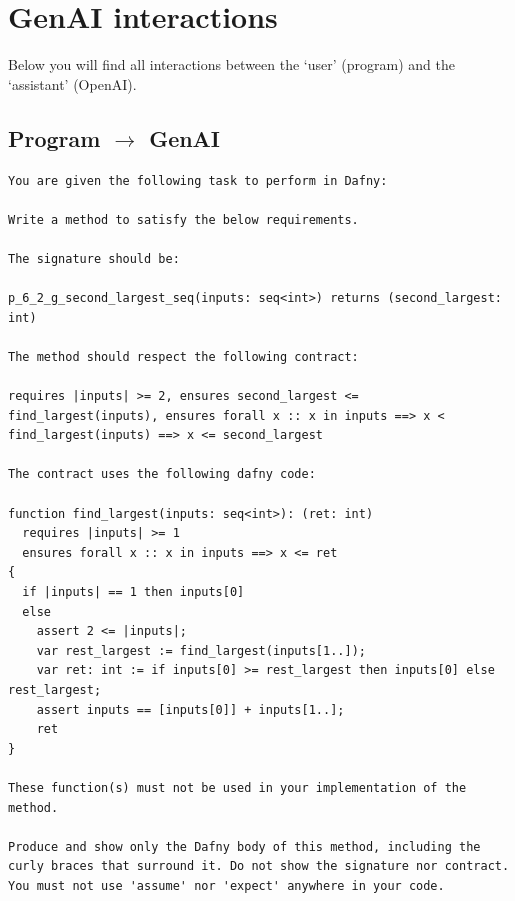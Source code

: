 \documentclass{article}
\begin{document}
\section*{GenAI interactions}
Below you will find all interactions between the `user' (program) and the `assistant' (OpenAI).
\subsection*{Program $\rightarrow$ GenAI}
\begin{lstlisting}
You are given the following task to perform in Dafny:

Write a method to satisfy the below requirements.

The signature should be:

p_6_2_g_second_largest_seq(inputs: seq<int>) returns (second_largest: int)

The method should respect the following contract:

requires |inputs| >= 2, ensures second_largest <= find_largest(inputs), ensures forall x :: x in inputs ==> x < find_largest(inputs) ==> x <= second_largest

The contract uses the following dafny code:

function find_largest(inputs: seq<int>): (ret: int)
  requires |inputs| >= 1
  ensures forall x :: x in inputs ==> x <= ret
{
  if |inputs| == 1 then inputs[0]
  else 
    assert 2 <= |inputs|;
    var rest_largest := find_largest(inputs[1..]);
    var ret: int := if inputs[0] >= rest_largest then inputs[0] else rest_largest;
    assert inputs == [inputs[0]] + inputs[1..]; 
    ret 
} 

These function(s) must not be used in your implementation of the method.

Produce and show only the Dafny body of this method, including the curly braces that surround it. Do not show the signature nor contract. You must not use 'assume' nor 'expect' anywhere in your code.
\end{lstlisting}
\end{document}

